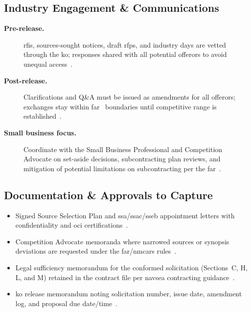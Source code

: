 \documentclass[../main.tex]{subfiles}
\begin{document}
\subsection{Industry Engagement \& Communications}
\begin{description}
  \item[\textbf{Pre-release.}] \acp{rfi}, sources-sought notices, draft \acp{rfp}, and industry days are vetted through the \ac{ko}; responses shared with all potential offerors to avoid unequal access~\autocite{FAR}.
  \item[\textbf{Post-release.}] Clarifications and Q\&A must be issued as amendments for all offerors; exchanges stay within \ac{far}~\autocite[\S~15.201]{FAR} boundaries until competitive range is established~\autocite{NAVSEA-Contracts-Handbook-2023}.
  \item[\textbf{Small business focus.}] Coordinate with the Small Business Professional and Competition Advocate on set-aside decisions, subcontracting plan reviews, and mitigation of potential limitations on subcontracting per the \ac{far}~\autocite{FAR}.
\end{description}

\subsection{Documentation \& Approvals to Capture}
\begin{itemize}
  \item Signed Source Selection Plan and \ac{ssa}/\ac{ssac}/\ac{sseb} appointment letters with confidentiality and \ac{oci} certifications~\autocite{NAVSEA-Source-Selection-Guide-2022}.
  \item Competition Advocate memoranda where narrowed sources or synopsis deviations are requested under the \ac{far}/\ac{nmcars} rules~\autocite{FAR,NMCARS}.
  \item Legal sufficiency memorandum for the conformed solicitation (Sections~C, H, L, and M) retained in the contract file per \ac{navsea} contracting guidance~\autocite{NAVSEA-Contracts-Handbook-2023}.
  \item \ac{ko} release memorandum noting solicitation number, issue date, amendment log, and proposal due date/time~\autocite{edo-3-2-2-solicitation-prep-2025}.
\end{itemize}
\end{document}
